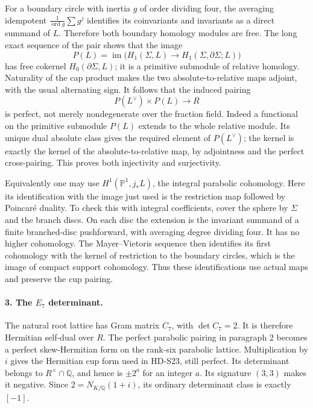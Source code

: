 For a boundary circle with inertia \(g\) of order dividing four,
the averaging idempotent \(\frac1{\operatorname{ord}g}\sum g^j\)
identifies its coinvariants and invariants as a direct summand of
\(L\). Therefore both boundary homology modules are free. The
long exact sequence of the pair shows that the image
\[
 P(L)=\operatorname{im}\bigl(H_1(\Sigma,L)
                 \longrightarrow H_1(\Sigma,\partial\Sigma;L)\bigr)
\]
has free cokernel \(H_0(\partial\Sigma,L)\); it is a primitive
submodule of relative homology. Naturality of the cap product makes
the two absolute-to-relative maps adjoint, with the usual alternating
sign. It follows that the induced pairing
\[
                       P(L^\vee)\times P(L)\longrightarrow R
\]
is perfect, not merely nondegenerate over the fraction field. Indeed
a functional on the primitive submodule \(P(L)\) extends to the
whole relative module. Its unique dual absolute class gives the
required element of \(P(L^\vee)\); the kernel is exactly the
kernel of the absolute-to-relative map, by adjointness and the
perfect cross-pairing. This proves both injectivity and surjectivity.

Equivalently one may use \(H^1(\mathbb P^1,j_*L)\), the integral
parabolic cohomology. Here its identification with the image just
used is the restriction map followed by Poincar\'e duality. To check
this with integral coefficients, cover the sphere by \(\Sigma\)
and the branch discs. On each disc the extension is the invariant
summand of a finite branched-disc pushforward, with averaging degree
dividing four. It has no higher cohomology. The Mayer--Vietoris
sequence then identifies its first cohomology with the kernel of
restriction to the boundary circles, which is the image of compact
support cohomology. Thus these identifications use actual maps and
preserve the cup pairing.

\paragraph{3. The \(E_7\) determinant.}
The natural root lattice has Gram matrix \(C_7\), with
\(\det C_7=2\). It is therefore Hermitian self-dual over \(R\).
The perfect parabolic pairing in paragraph 2 becomes a perfect
skew-Hermitian form on the rank-six parabolic lattice. Multiplication
by \(i\) gives the Hermitian cup form used in HD-S23, still perfect.
Its determinant belongs to \(R^\times\cap\mathbb Q\), and hence
is \(\pm2^a\) for an integer \(a\). Its signature \((3,3)\)
makes it negative. Since \(2=N_{K/\mathbb Q}(1+i)\), its ordinary
determinant class is exactly \([-1]\).

